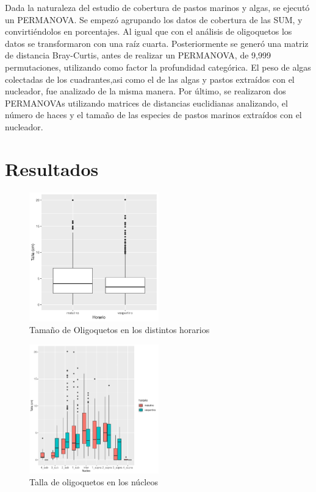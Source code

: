 \documentclass[
  authoryear,
  preprint,
  3p,
  twocolumn]{elsarticle}
\begin{document}
Dada la naturaleza del estudio de cobertura de pastos marinos y algas,
se ejecutó un PERMANOVA. Se empezó agrupando los datos de cobertura de
las SUM, y convirtiéndolos en porcentajes. Al igual que con el análisis
de oligoquetos los datos se transformaron con una raíz cuarta.
Posteriormente se generó una matriz de distancia Bray-Curtis, antes de
realizar un PERMANOVA, de 9,999 permutaciones, utilizando como factor la
profundidad categórica. El peso de algas colectadas de los
cuadrantes,asi como el de las algas y pastos extraídos con el nucleador,
fue analizado de la misma manera. Por último, se realizaron dos
PERMANOVAs utilizando matrices de distancias euclidianas analizando, el
número de haces y el tamaño de las especies de pastos marinos extraídos
con el nucleador.

\section{Resultados}\label{resultados}

\begin{figure}[H]

{\centering \includegraphics[width=0.5\textwidth,height=\textheight]{ECVI_files/figure-pdf/fig1-1.pdf}

}

\caption{Tamaño de Oligoquetos en los distintos horarios}

\end{figure}%

\begin{figure}[H]

{\centering \includegraphics[width=0.5\textwidth,height=\textheight]{ECVI_files/figure-pdf/Fig2-1.pdf}

}

\caption{Talla de oligoquetos en los núcleos}

\end{figure}%
\end{document}
